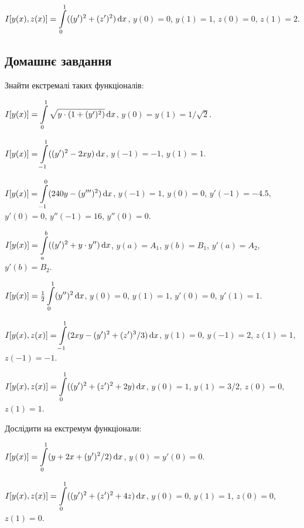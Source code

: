 \begin{problem}
	$I[y(x), z(x)] = \displaystyle\int\limits_0^1 ((y')^2 + (z')^2) \mathop{}\!\mathrm{d} x$, $y(0) = 0$, $y(1) = 1$, $z(0) = 0$, $z(1) = 2$.
\end{problem}

\subsection*{Домашнє завдання}

Знайти екстремалі таких функціоналів:

\begin{problem}
	$I[y(x)] = \displaystyle\int\limits_0^1 \sqrt{y \cdot (1 + (y')^2)} \mathop{}\!\mathrm{d} x$, $y(0) = y(1) = 1 / \sqrt{2}$.
\end{problem}

\begin{problem}
	$I[y(x)] = \displaystyle\int\limits_{-1}^1 ((y')^2 - 2 x y) \mathop{}\!\mathrm{d} x$, $y(-1) = -1$, $y(1) = 1$.
\end{problem}

\begin{problem}
	$I[y(x)] = \displaystyle\int\limits_{-1}^0 (240 y - (y''')^2) \mathop{}\!\mathrm{d} x$, $y(-1) = 1$, $y(0) = 0$, $y'(-1) = -4.5$, $y'(0) = 0$, $y''(-1) = 16$, $y''(0) = 0$.
\end{problem}

\begin{problem}
	$I[y(x)] = \displaystyle\int\limits_a^b ((y')^2 + y \cdot y'') \mathop{}\!\mathrm{d} x$, $y(a) = A_1$, $y(b) = B_1$, $y'(a) = A_2$, $y'(b) = B_2$.
\end{problem}

\begin{problem}
	$I[y(x)] = \frac{1}{2} \displaystyle\int\limits_0^1 (y'')^2 \mathop{}\!\mathrm{d} x$, $y(0) = 0$, $y(1) = 1$, $y'(0) = 0$, $y'(1) = 1$.
\end{problem}

\begin{problem}
	$I[y(x), z(x)] = \displaystyle\int\limits_{-1}^1 ( 2 x y - (y')^2 + (z')^3 / 3 ) \mathop{}\!\mathrm{d} x$, $y(1) = 0$, $y(-1) = 2$, $z(1) = 1$, $z(-1) = -1$.
\end{problem}

\begin{problem}
	$I[y(x), z(x)] = \displaystyle\int\limits_0^1 ((y')^2 + (z')^2 + 2 y) \mathop{}\!\mathrm{d} x$, $y(0) = 1$, $y(1) = 3 / 2$, $z(0) = 0$, $z(1) = 1$.
\end{problem}

Дослідити на екстремум функціонали:

\begin{problem}
	$I[y(x)] = \displaystyle\int\limits_0^1 (y + 2 x + (y')^2 / 2) \mathop{}\!\mathrm{d} x$, $y(0) = y'(0) = 0$.
\end{problem}

\begin{problem}
	$I[y(x), z(x)] = \displaystyle\int\limits_0^1 ((y')^2 + (z')^2 + 4 z) \mathop{}\!\mathrm{d} x$, $y(0) = 0$, $y(1) = 1$, $z(0) = 0$, $z(1) = 0$.
\end{problem}
